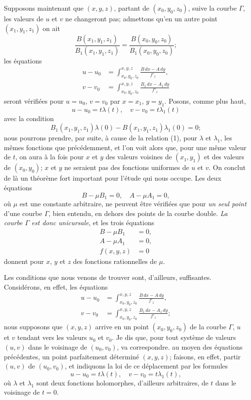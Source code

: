 \documentclass{article}
\begin{document}
Supposons maintenant que $(x, y, z)$, partant de $(x_{0}, y_{0}, z_{0})$, suive la courbe $\Gamma$, les valeurs de $u$ et $v$ ne changeront pas; admettons qu'en un autre point $(x_{1}, y_{1}, z_{1})$ on ait
\[
\frac{B(x_{1}, y_{1}, z_{1})}{B_{1}(x_{1}, y_{1}, z_{1})} = \frac{B(x_{0}, y_{0}, z_{0})}{B_{1}(x_{0}, y_{0}, z_{0})}; \tag{1}
\]
les équations
\[
\begin{aligned}
u - u_{0} &= \int_{x_{0}, y_{0}, z_{0}}^{x, y, z} \frac{B\,dx - A\,dy}{f'_{z}}, \\
v - v_{0} &= \int_{x_{0}, y_{0}, z_{0}}^{x, y, z} \frac{B_{1}\,dx - A_{1}\,dy}{f'_{z}}
\end{aligned}
\]
seront vérifiées pour $u = u_{0}$, $v = v_{0}$ par $x = x_{1}$, $y = y_{1}$. Posons, comme plus haut,
\[
u - u_{0} = t\lambda(t), \quad v - v_{0} = t\lambda_{1}(t)
\]
avec la condition
\[
B_{1}(x_{1}, y_{1}, z_{1})\lambda(0) - B(x_{1}, y_{1}, z_{1})\lambda_{1}(0) = 0;
\]
nous pourrons prendre, par suite, à cause de la relation (1), pour $\lambda$ et $\lambda_{1}$, les mêmes fonctions que précédemment, et l'on voit alors que, pour une même valeur de $t$, on aura à la fois pour $x$ et $y$ des valeurs voisines
de $(x_{1}, y_{1})$ et des valeurs de $(x_{0}, y_{0})$; $x$ et $y$ ne seraient pas des fonctions uniformes de $u$ et $v$. On conclut de là un théorème fort important pour l'étude qui nous occupe. Les deux équations
\[
B - \mu B_{1} = 0, \quad A - \mu A_{1} = 0,
\]
où $\mu$ est une constante arbitraire, ne peuvent être vérifiées que pour \emph{un seul point} d'une courbe $\Gamma$, bien entendu, en dehors des points de la courbe double. \emph{La courbe $\Gamma$ est donc unicursale}, et les trois équations
\[
\begin{aligned}
B - \mu B_{1} &= 0, \\
A - \mu A_{1} &= 0, \\
f(x, y, z) &= 0
\end{aligned}
\]
donnent pour $x$, $y$ et $z$ des fonctions rationnelles de $\mu$.

Les conditions que nous venons de trouver sont, d'ailleurs, suffisantes. Considérons, en effet, les équations
\[
\begin{aligned}
u - u_{0} &= \int_{x_{0}, y_{0}, z_{0}}^{x, y, z} \frac{B\,dx - A\,dy}{f'_{z}}, \\
v - v_{0} &= \int_{x_{0}, y_{0}, z_{0}}^{x, y, z} \frac{B_{1}\,dx - A_{1}\,dy}{f'_{z}};
\end{aligned}
\]
nous supposons que $(x, y, z)$ arrive en un point $(x_{0}, y_{0}, z_{0})$ de la courbe $\Gamma$, $u$ et $v$ tendant vers les valeurs $u_{0}$ et $v_{0}$. Je dis que, pour tout système de valeurs $(u, v)$ dans le voisinage de $(u_{0}, v_{0})$, va correspondre. au moyen des équations précédentes, un point parfaitement déterminé $(x, y, z)$; faisons, en effet, partir $(u, v)$ de $(u_{0}, v_{0})$, et indiquons la loi de ce déplacement par les formules
\[
u - u_{0} = t\lambda(t), \quad v - v_{0} = t\lambda_{1}(t),
\]
où $\lambda$ et $\lambda_{1}$ sont deux fonctions holomorphes, d'ailleurs arbitraires, de $t$ dans le voisinage de $t = 0$.
\end{document}
